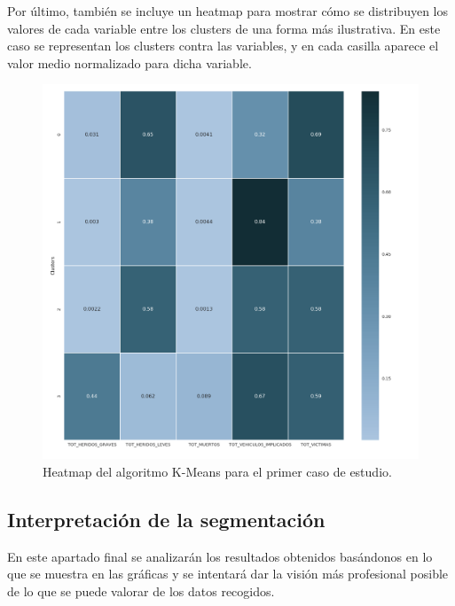 	Por último, también se incluye un heatmap para mostrar cómo se distribuyen los valores de cada variable entre los clusters de una forma más ilustrativa. En este caso se representan los clusters contra las variables, y en cada casilla aparece el valor medio normalizado para dicha variable.
	
	\begin{figure}[H]
		\centering
		\includegraphics[scale=0.4]{heatmaps/K-Means-HighwayAccidents-Heatmap.png}
		\caption{Heatmap del algoritmo K-Means para el primer caso de estudio.}
	\end{figure}

	\subsection{Interpretación de la segmentación}
	En este apartado final se analizarán los resultados obtenidos basándonos en lo que se muestra en las gráficas y se intentará dar la visión más profesional posible de lo que se puede valorar de los datos recogidos.\\
	
